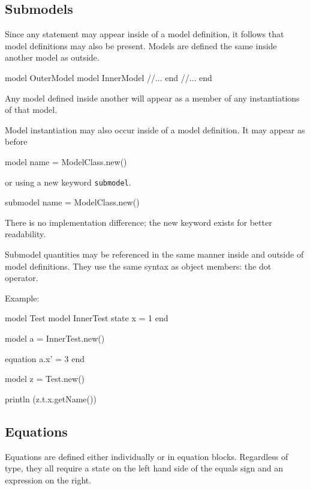 \documentclass[11pt]{article}
\newcommand{\literal}[1]{\lstinline[style=DSL,identifierstyle=\itshape]!#1!}
\newcommand{\keyword}[1]{\literal{#1}}
\begin{document}
\subsection{Submodels}

Since any statement may appear inside of a model definition, it
follows that model definitions may also be present.  Models are
defined the same inside another model as outside.

\begin{dsl}
model OuterModel
  model InnerModel
    //...
  end
  //...
end
\end{dsl}

Any model defined inside another will appear as a member of any
instantiations of that model.  

Model instantiation may also occur inside of a model definition.  It
may appear as before 

\begin{dsl}
model name = ModelClass.new()
\end{dsl}

or using a new keyword \keyword{submodel}.

\begin{dsl}
submodel name = ModelClass.new()
\end{dsl}

There is no implementation difference; the new keyword exists for
better readability.

Submodel quantities may be referenced in the same manner inside and
outside of model definitions.  They use the same syntax as object
members: the dot operator.

Example:

\begin{dsl}
model Test
  model InnerTest
    state x = 1
  end
  
  model a = InnerTest.new()

  equation a.x' = 3
end

model z = Test.new()

println (z.t.x.getName())
\end{dsl}

\subsection{Equations}

Equations are defined either individually or in equation blocks.
Regardless of type, they all require a state on the left hand side of
the equals sign and an expression on the right.  
\end{document}
